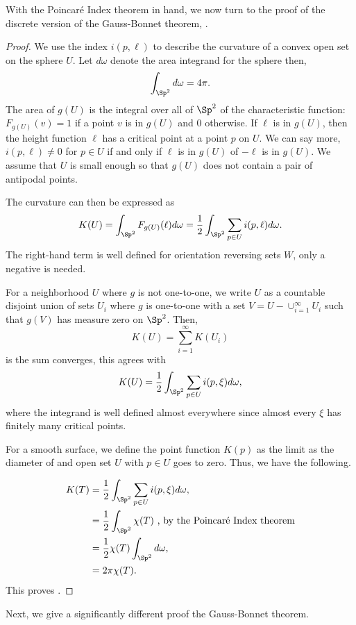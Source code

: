 With the Poincar\'e Index theorem in hand, we now turn to the proof of
the discrete version of the Gauss-Bonnet theorem, .
\begin{proof}


We use the index $i(p,\ell)$ to describe the curvature of a convex open
set on the sphere $U$. Let $d\omega$ denote the area integrand for the sphere
then,
$$\int_{\Sp^2} d\omega =4\pi.$$
The area of $g(U)$ is the integral over all of $\Sp^2$ of the characteristic function:
$F_{g(U)}(v)=1$ if a point $v$ is in $g(U)$ and $0$ otherwise.
If $\ell$ is in $g(U)$, then the height function $\ell$ has a critical point at
a point $p$ on $U$. We can say more, $i(p,\ell)\neq 0$ for $p\in U$ if and only if
$\ell$ is in $g(U)$ of $-\ell$ is in $g(U)$. We assume that $U$ is small enough so that
$g(U)$ does not contain a pair of antipodal points.

The curvature can then be expressed as 
$$K(U)=\int_{\Sp^2}F_{g(U)}(\ell)d\omega =\frac{1}{2}\int_{\Sp^2}\sum_{p\in U} i(p,\ell)d\omega.$$
The right-hand term is well defined for orientation reversing sets $W$, only a negative is needed.

For a neighborhood $U$ where $g$ is not one-to-one, we write $U$ as a countable
disjoint union of sets $U_i$ where $g$ is one-to-one with a set $V=U-\cup_{i=1}^\infty U_i$
such that $g(V)$ has measure zero on $\Sp^2$. Then,
$$K(U)=\sum_{i=1}^\infty K(U_i)$$ is the sum converges, this agrees with 
$$K(U)=\frac{1}{2}\int_{\Sp^2}\sum_{p\in U} i(p,\xi)d\omega,$$
where the integrand is well defined almost everywhere since almost every $\xi$
has finitely many critical points.

For a smooth surface, we define the point function $K(p)$ as the limit as the diameter of 
and open set $U$ with $p\in U$ goes to zero. Thus, we have the following.

\begin{align}
K(T) &=\frac{1}{2}\int_{\Sp^2}\sum_{p\in U} i(p,\xi)d\omega,  \\ \nonumber
       &=\frac{1}{2}\int_{\Sp^2}\chi(T) \text{ , by the Poincar\'e Index theorem}\\ \nonumber
       &=\frac{1}{2}\chi(T)\int_{\Sp^2}d\omega, \\ \nonumber
       &=2\pi\chi(T). \nonumber 
\end{align}
This proves .

\end{proof}
Next, we give a significantly different proof the Gauss-Bonnet theorem. 


